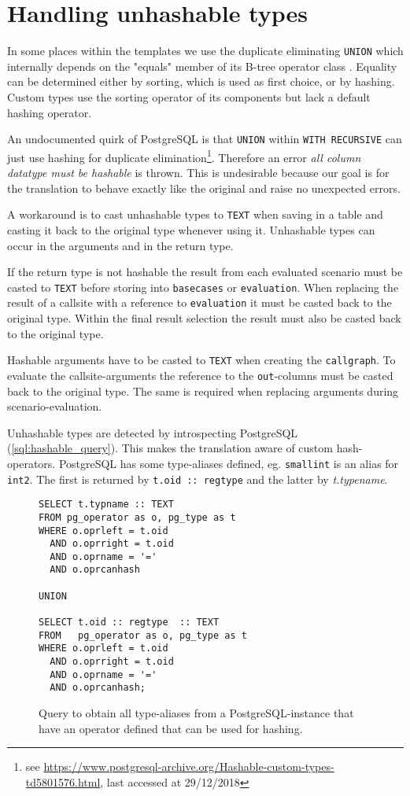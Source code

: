 \section{Handling unhashable types}

In some places within the templates we use the duplicate eliminating \texttt{UNION} which internally depends on the "equals" member of its B-tree operator class \cite[p. 1042 f.]{psql}. Equality can be determined either by sorting, which is used as first choice, or by hashing. Custom types use the sorting operator of its components but lack a default hashing operator.

An undocumented quirk of PostgreSQL is that \texttt{UNION} within \texttt{WITH RECURSIVE} can just use hashing for duplicate elimination\footnote{see \url{https://www.postgresql-archive.org/Hashable-custom-types-td5801576.html}, last accessed at 29/12/2018}. Therefore an error \textit{all column datatype must be hashable} is thrown. This is undesirable because our goal is for the translation to behave exactly like the original and raise no unexpected errors.

A workaround is to cast unhashable types to \texttt{TEXT} when saving in a table and casting it back to the original type whenever using it. Unhashable types can occur in the arguments and in the return type.

If the return type is not hashable the result from each evaluated scenario must be casted to \texttt{TEXT} before storing into \texttt{basecases} or \texttt{evaluation}. When replacing the result of a callsite with a reference to \texttt{evaluation} it must be casted back to the original type. Within the final result selection the result must also be casted back to the original type.

Hashable arguments have to be casted to \texttt{TEXT} when creating the \texttt{callgraph}. To evaluate the callsite-arguments the reference to the \texttt{out}-columns must be casted back to the original type. The same is required when replacing arguments during scenario-evaluation.

Unhashable types are detected by introspecting PostgreSQL (\autoref{sql:hashable_query}). This makes the translation aware of custom hash-operators. PostgreSQL has some type-aliases defined, eg. \texttt{smallint} is an alias for \texttt{int2}. The first is returned by \texttt{t.oid :: regtype} and the latter by \textit{t.typename}.

\begin{figure}
    \centering
\begin{verbatim}
SELECT t.typname :: TEXT 
FROM pg_operator as o, pg_type as t 
WHERE o.oprleft = t.oid 
  AND o.oprright = t.oid 
  AND o.oprname = '=' 
  AND o.oprcanhash 

UNION

SELECT t.oid :: regtype  :: TEXT 
FROM   pg_operator as o, pg_type as t 
WHERE o.oprleft = t.oid 
  AND o.oprright = t.oid 
  AND o.oprname = '=' 
  AND o.oprcanhash;
\end{verbatim}
    \caption{Query to obtain all type-aliases from a PostgreSQL-instance that have an operator defined that can be used for hashing.}
    \label{sql:hashable_query}
\end{figure}